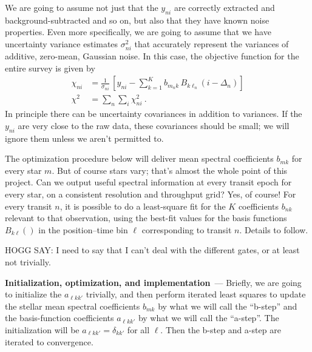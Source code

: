 \documentclass{article}
\renewcommand{\paragraph}[1]{\bigskip\par\noindent\textbf{#1}~---}
\begin{document}
We are going to assume not just that the $y_{ni}$ are correctly extracted and background-subtracted and so on, but also that they have known noise properties.
Even more specifically, we are going to assume that we have uncertainty variance estimates $\sigma^2_{ni}$ that accurately represent the variances of additive, zero-mean, Gaussian noise.
In this case, the objective function for the entire survey is given by
\begin{align}
    \chi_{ni} &= \frac{1}{\sigma_{ni}}\,\left[y_{ni} - \sum_{k=1}^K b_{m_nk}\,B_{k\ell_n}(i-\Delta_n)\right] \label{eq:chi}\\
    \chi^2 &= \sum_n\sum_i \chi_{ni}^2 ~.
\end{align}
In principle there can be uncertainty covariances in addition to variances.
If the $y_{ni}$ are very close to the raw data, these covariances should be small;
we will ignore them unless we aren't permitted to.

The optimization procedure below will deliver mean spectral coefficients $b_{mk}$ for every star $m$.
But of course stars vary; that's almost the whole point of this project.
Can we output useful spectral information at every transit epoch for every star, on a consistent resolution and throughput grid?
Yes, of course!
For every transit $n$, it is possible to do a least-square fit for the $K$ coefficients $b_{nk}$ relevant to that observation, using the best-fit values for the basis functions $B_{k\ell}()$ in the position--time bin $\ell$ corresponding to transit $n$.
Details to follow.

HOGG SAY: I need to say that I can't deal with the different gates, or at least not trivially.

\paragraph{Initialization, optimization, and implementation}
Briefly, we are going to initialize the $a_{\ell kk'}$ trivially, and then perform iterated least squares to update the stellar mean spectral coefficients $b_{mk}$ by what we will call the ``b-step'' and the basis-function coefficients $a_{\ell kk'}$ by what we will call the ``a-step''.
The initialization will be $a_{\ell kk'}=\delta_{kk'}$ for all $\ell$.
Then the b-step and a-step are iterated to convergence.
\end{document}

